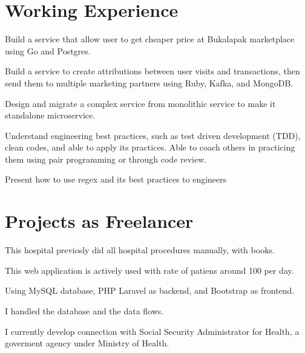\documentclass[letterpaper]{deedy-resume} %
\begin{document}
\hfill
\begin{minipage}[t]{0.66\textwidth} %


\section{Working Experience}

\vspace{\topsep} %
\begin{tightitemize}
\item Build a service that allow user to get cheaper price at Bukalapak marketplace using Go and Postgres.
\item Build a service to create attributions between user visits and transactions, then send them to multiple marketing partners using Ruby, Kafka, and MongoDB.
\item Design and migrate a complex service from monolithic service to make it standalone microservice.
\item Understand engineering best practices, such as test driven development (TDD), clean codes, and able to apply its practices. Able to coach others in practicing them using pair programming or through code review.
\item Present how to use regex and its best practices to engineers
\end{tightitemize}


\section{Projects as Freelancer}

\begin{tightitemize}
\item This hospital previosly did all hospital procedures manually, with books.
\item This web application is actively used with rate of patiens around 100 per day.
\item Using MySQL database, PHP Laravel as backend, and Bootstrap as frontend.
\item I handled the database and the data flows.
\item I currently develop connection with Social Security Administrator for Health, a goverment agency under Ministry of Health.
\end{tightitemize}
\sectionspace


\end{minipage}
\end{document}
